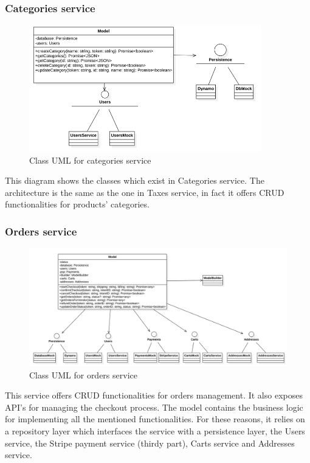 \subsubsection{Categories service}
\begin{figure}[H]
    \includegraphics[width=0.9\textwidth]{res/images/class-diagrams/categories.png}
    \caption{Class UML for categories service}
\end{figure}
This diagram shows the classes which exist in Categories service. The architecture is the same as the one in Taxes service,
in fact it offers CRUD functionalities for products' categories.

\subsubsection{Orders service}
\begin{figure}[H]
    \includegraphics[width=\textwidth]{res/images/class-diagrams/orders.png}
    \caption{Class UML for orders service}
\end{figure}
This service offers CRUD functionalities for orders management. It also exposes API's for managing the checkout process.
The model contains the business logic for implementing all the mentioned functionalities. For these reasons, it relies on a repository layer
which interfaces the service with a persistence layer, the Users service, the Stripe payment service (thirdy part), Carts service and Addresses service.

